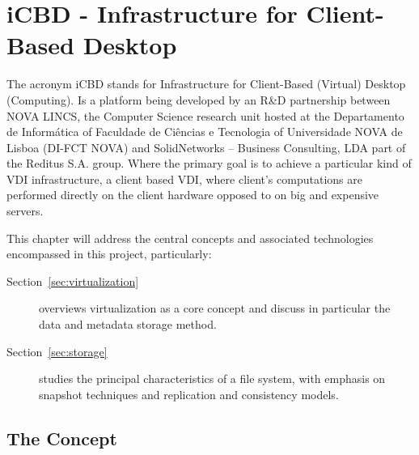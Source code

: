 
\chapter{iCBD - Infrastructure for Client-Based Desktop}
\label{cha:icbd}

The acronym iCBD stands for Infrastructure for Client-Based (Virtual) Desktop (Computing). Is a platform being developed by an R\&D partnership between NOVA LINCS, the Computer Science research unit hosted at the Departamento de Informática of Faculdade de Ciências e Tecnologia of Universidade NOVA de Lisboa (DI-FCT NOVA) and SolidNetworks – Business Consulting, LDA part of the Reditus S.A. group. 
Where the primary goal is to achieve a particular kind of VDI infrastructure, a client based VDI, where client's computations are performed directly on the client hardware opposed to on big and expensive servers.

This chapter will address the central concepts and associated technologies encompassed in this project, particularly:

\begin{description}
	\item [Section~\ref{sec:virtualization}] overviews virtualization as a core concept and discuss in particular the data and metadata storage method.
	\item [Section~\ref{sec:storage}] studies the principal characteristics of a file system, with emphasis on snapshot techniques and replication and consistency models.

\end{description}


\section{The Concept} %
\label{sec:icbd_concept}


